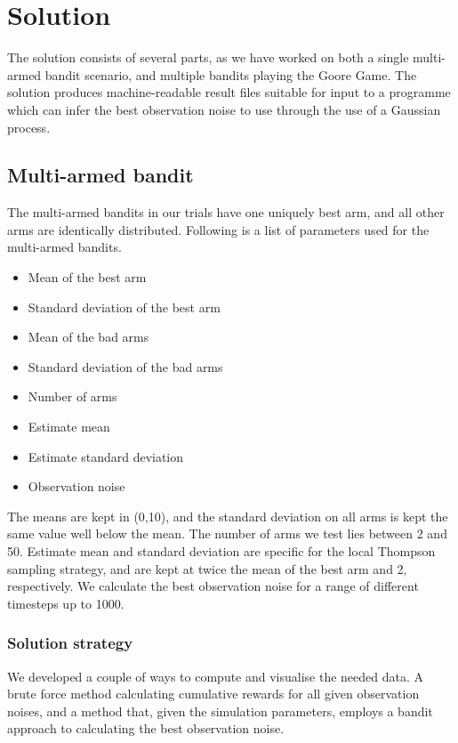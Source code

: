 \chapter{Solution}
\label{ch:solution}

The solution consists of several parts, as we have worked on both a single multi-armed bandit scenario, and multiple bandits playing the Goore Game.
The solution produces machine-readable result files suitable for input to a programme which can infer the best observation noise to use through the use of a Gaussian process.

\section{Multi-armed bandit}
The multi-armed bandits in our trials have one uniquely best arm, and all other arms are identically distributed.
Following is a list of parameters used for the multi-armed bandits.
\begin{itemize}
    \item Mean of the best arm
    \item Standard deviation of the best arm
    \item Mean of the bad arms
    \item Standard deviation of the bad arms
    \item Number of arms
    \item Estimate mean
    \item Estimate standard deviation
    \item Observation noise
\end{itemize}

The means are kept in (0,10), and the standard deviation on all arms is kept the same value well below the mean.
The number of arms we test lies between 2 and 50.
Estimate mean and standard deviation are specific for the local Thompson sampling strategy, and are kept at twice the mean of the best arm and 2, respectively.
We calculate the best observation noise for a range of different timesteps up to 1000.

\subsection{Solution strategy}
We developed a couple of ways to compute and visualise the needed data.
A brute force method calculating cumulative rewards for all given observation noises, and a method that, given the simulation parameters, employs a bandit approach to calculating the best observation noise.

